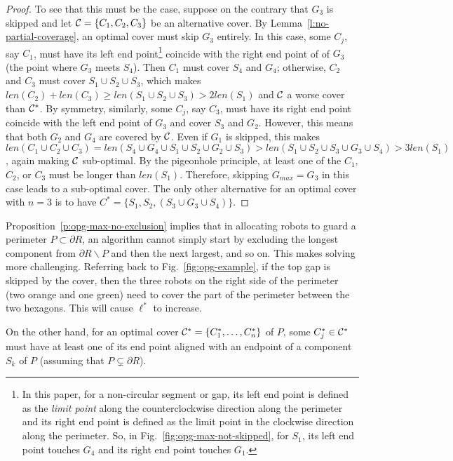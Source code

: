 \begin{proof}
To see that this must be the case, suppose on the contrary that $G_3$ 
is skipped and let $\mathcal C = \{C_1, C_2, C_3\}$ be an alternative cover. 
By Lemma~\ref{l:no-partial-coverage}, an optimal cover must skip $G_3$ 
entirely. In this case, some $C_j$, say $C_1$, must have its left end 
point\footnote{In this paper, for a non-circular segment or gap, its 
left end point is defined as the {\em limit point} along the 
counterclockwise direction along the perimeter and its right end point 
is defined as the limit point in the clockwise direction along the 
perimeter. So, in Fig.~\ref{fig:opg-max-not-skipped}, for $S_1$, its left 
end point touches $G_4$ and its right end point touches $G_1$.} coincide 
with the right end point of of $G_3$ (the point where $G_3$ meets $S_4$). 
Then $C_1$ must cover $S_4$ and $G_4$; otherwise, $C_2$ and $C_3$ must 
cover $S_1 \cup S_2 \cup S_3$, which makes $len(C_2) + len(C_3) \ge 
len(S_1 \cup S_2 \cup S_3) > 2len(S_1)$ and $\mathcal C$ a worse cover than 
$\mathcal C^*$. By symmetry, similarly, some $C_j$, say $C_3$, must have its 
right end point coincide with the left end point of $G_3$ and cover 
$S_3$ and $G_2$. However, this means that both $G_2$ and $G_4$ are 
covered by $\mathcal C$. Even if $G_1$ is skipped, this makes $len(C_1 \cup 
C_2 \cup C_3) = len(S_4 \cup G_4 \cup S_1 \cup S_2 \cup G_2 \cup S_3) 
> len (S_1 \cup S_2 \cup S_3\cup G_3\cup S_4) > 3len(S_1)$, again making
$\mathcal C$ sub-optimal. By the pigeonhole principle, at least one of the $C_1$, 
$C_2$, or $C_3$ must be longer than $len(S_1)$. Therefore, skipping 
$G_{max} = G_3$ in this case leads to a sub-optimal cover. The only 
other alternative for an optimal cover with $n = 3$ is to have $C^* = 
\{S_1, S_2, (S_3\cup G_3\cup S_4)\}$. 
\end{proof}

Proposition~\ref{p:opg-max-no-exclusion} implies that in allocating robots 
to guard a perimeter $P \subset \partial R$, an algorithm cannot simply 
start by excluding the longest component from $\partial R 
\backslash P$ and then the next largest, and so on. This makes solving
\opg more challenging. Referring back to Fig.~\ref{fig:opg-example}, if the 
top gap is skipped by the cover, then the three robots on the right side 
of the perimeter (two orange and one green) need to cover the part of the 
perimeter between the two hexagons. This will cause $\ell^*$ to increase. 

On the other hand, for an optimal cover $\mathcal C^* = \{C_1^*, \ldots, C_n^*\}$ 
of $P$, some $C_j^*\in \mathcal C^*$ must have at least one of its end point 
aligned with an endpoint of a component $S_k$ of $P$ (assuming that $P 
\subsetneq \partial R$). 

